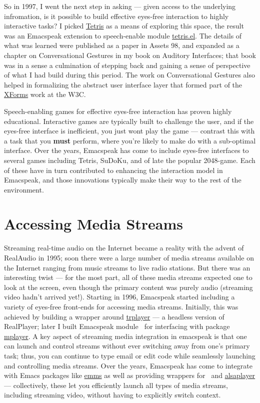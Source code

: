 \documentclass[11pt]{article}
\begin{document}
So in 1997, I went the
next step in asking  —   given access to the underlying
infromation, is it possible to build effective eyes-free
interaction to highly interactive tasks? I picked \uline{Tetris} as a
means of exploring this space, the result was an Emacspeak
extension to speech-enable module \uline{tetris.el}. The details of
what was learned were published as a paper in Assets 98, and
expanded as a chapter on Conversational Gestures in my book on
Auditory Interfaces; that book was in a sense a culmination of
stepping back and gaining a sense of perspective of what I had
build during this period. The work on Conversational Gestures
also helped in formalizing the abstract user interface layer that
formed part of the \href{http://www.w3.org/MarkUp/Forms/}{XForms}  work at the W3C.

Speech-enabling games for effective eyes-free interaction  has
proven highly educational. Interactive games are typically built to challenge
the user,  and if the eyes-free interface is inefficient,  you
just wont play the game —
 contrast this with a task that you \textbf{must} perform, where you're
likely to make do with a sub-optimal interface.  Over the years,
Emacspeak has come to include eyes-free interfaces to several
games including Tetris, SuDoKu, and of late the popular
2048-game. Each of these have in turn contributed to  enhancing
the interaction model in Emacspeak, and those innovations
typically make their way to the rest of the environment. 


\section{Accessing Media Streams}
\label{sec-10}

Streaming real-time audio on the Internet became a reality with
the advent of RealAudio in 1995; soon there were a large number
of media streams available on the Internet ranging from music
streams to live radio stations. But there was an interesting
twist — for the most part, all of these media streams expected
one to look at the screen, even though the primary content was
purely audio (streaming video hadn't arrived yet!). Starting in
1996, Emacspeak started including a variety of eyes-free
front-ends for accessing media streams. Initially, this was
achieved by building a wrapper around \uline{trplayer} — a headless
version of RealPlayer; later I built Emacspeak module
$_{\text{ }}$for interfacing with package \uline{mplayer}. A
key aspect of streaming media integration in emacspeak is that
one can launch and control streams without ever switching away
from one's primary task; thus, you can continue to type email or
edit code while seamlessly launching and controlling media
streams. Over the years, Emacspeak has come to integrate with
Emacs packages like \uline{emms} as well as providing wrappers for
$_{\text{ }}$and \uline{alsaplayer} — collectively, these let you
efficiently launch all types of media streams, including
streaming video, without having to explicitly switch context.
\end{document}
